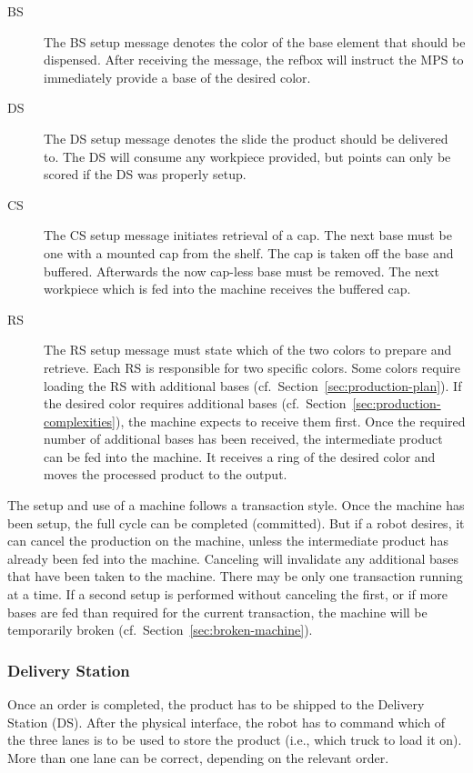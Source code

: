 \documentclass[12pt,twoside]{article}
\newcommand{\refsec}[1]{Section~\ref{#1}}
\begin{document}
\begin{description}
\item[BS] The BS setup message denotes the color of the base element
  that should be dispensed. After receiving the message, the refbox
  will instruct the MPS to immediately provide a base of the desired
  color.
\item[DS] The DS setup message denotes the slide the product should be
  delivered to. The DS will consume any workpiece provided, but points
  can only be scored if the DS was properly setup.
\item[CS] The CS setup message initiates retrieval of a cap. The next
  base must be one with a mounted cap from the shelf. The cap is taken
  off the base and buffered. Afterwards the now cap-less base must be
  removed. The next workpiece which is fed into the machine receives
  the buffered cap.
\item[RS] The RS setup message must state which of the two colors to
  prepare and retrieve. Each RS is responsible for two specific
  colors. Some colors require loading the RS with additional bases
  (cf.~\refsec{sec:production-plan}). If the desired color requires
  additional bases (cf.~\refsec{sec:production-complexities}), the
  machine expects to receive them first. Once the required number of
  additional bases has been received, the intermediate product can be
  fed into the machine. It receives a ring of the desired color and
  moves the processed product to the output.
\end{description}

\noindent
The setup and use of a machine follows a transaction style. Once the
machine has been setup, the full cycle can be completed (committed).
But if a robot desires, it can cancel the production on the machine,
unless the intermediate product has already been fed into the
machine. Canceling will invalidate any additional bases that have
been taken to the machine. There may be only one transaction running
at a time. If a second setup is performed without canceling the
first, or if more bases are fed than required for the current
transaction, the machine will be temporarily broken
(cf.~\refsec{sec:broken-machine}).

\subsubsection{Delivery Station} 
\label{sec:delivery-station}
Once an order is completed, the product has to be shipped to the 
Delivery Station (DS). After the physical interface, the robot has to
command which of the three lanes is to be used to store the
product (i.e., which truck to load it on). More than one lane can be correct,
depending on the relevant order.
\end{document}
